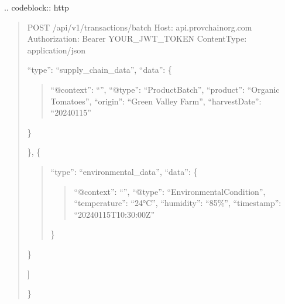 \documentclass[letterpaper,10pt,english]{sphinxmanual}
\begin{document}
\sphinxAtStartPar
{}
.. code\sphinxhyphen{}block:: http
\begin{quote}

\sphinxAtStartPar
POST /api/v1/transactions/batch
Host: api.provchain\sphinxhyphen{}org.com
Authorization: Bearer YOUR\_JWT\_TOKEN
Content\sphinxhyphen{}Type: application/json
\begin{description}
\sphinxlineitem{\{}\begin{description}
\sphinxlineitem{“transactions”: {[}}\begin{description}
\sphinxlineitem{\{}
\sphinxAtStartPar
“type”: “supply\_chain\_data”,
“data”: \{
\begin{quote}

\sphinxAtStartPar
“@context”: “”,
“@type”: “ProductBatch”,
“product”: “Organic Tomatoes”,
“origin”: “Green Valley Farm”,
“harvestDate”: “2024\sphinxhyphen{}01\sphinxhyphen{}15”
\end{quote}

\sphinxAtStartPar
\}

\end{description}

\sphinxAtStartPar
\},
\{
\begin{quote}

\sphinxAtStartPar
“type”: “environmental\_data”,
“data”: \{
\begin{quote}

\sphinxAtStartPar
“@context”: “”,
“@type”: “EnvironmentalCondition”,
“temperature”: “2\sphinxhyphen{}4°C”,
“humidity”: “85\%”,
“timestamp”: “2024\sphinxhyphen{}01\sphinxhyphen{}15T10:30:00Z”
\end{quote}

\sphinxAtStartPar
\}
\end{quote}

\sphinxAtStartPar
\}

\end{description}

\sphinxAtStartPar
{]}

\end{description}

\sphinxAtStartPar
\}
\end{quote}
\end{document}
